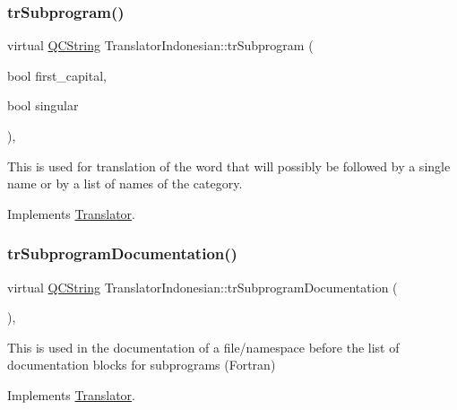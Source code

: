\subsubsection{\texorpdfstring{trSubprogram()}{trSubprogram()}}
{\footnotesize\ttfamily virtual \mbox{\hyperlink{class_q_c_string}{Q\+C\+String}} Translator\+Indonesian\+::tr\+Subprogram (\begin{DoxyParamCaption}\item[{bool}]{first\+\_\+capital,  }\item[{bool}]{singular }\end{DoxyParamCaption})\hspace{0.3cm}{\ttfamily [inline]}, {\ttfamily [virtual]}}

This is used for translation of the word that will possibly be followed by a single name or by a list of names of the category. 

Implements \mbox{\hyperlink{class_translator}{Translator}}.

\mbox{\label{class_translator_indonesian_af25346c99ac7a9f69cb104209d2b941b}} 
\subsubsection{\texorpdfstring{trSubprogramDocumentation()}{trSubprogramDocumentation()}}
{\footnotesize\ttfamily virtual \mbox{\hyperlink{class_q_c_string}{Q\+C\+String}} Translator\+Indonesian\+::tr\+Subprogram\+Documentation (\begin{DoxyParamCaption}{ }\end{DoxyParamCaption})\hspace{0.3cm}{\ttfamily [inline]}, {\ttfamily [virtual]}}

This is used in the documentation of a file/namespace before the list of documentation blocks for subprograms (Fortran) 

Implements \mbox{\hyperlink{class_translator}{Translator}}.

\mbox{\label{class_translator_indonesian_a7653ab180fa3a2e705cd457943b90aa0}} 
